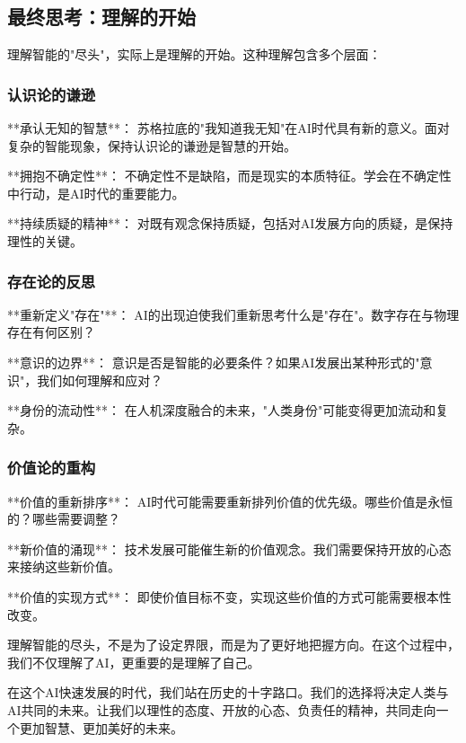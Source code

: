 \subsection{最终思考：理解的开始} %

理解智能的"尽头"，实际上是理解的开始。这种理解包含多个层面：

\subsubsection{认识论的谦逊}

**承认无知的智慧**：
苏格拉底的"我知道我无知"在AI时代具有新的意义。面对复杂的智能现象，保持认识论的谦逊是智慧的开始。

**拥抱不确定性**：
不确定性不是缺陷，而是现实的本质特征。学会在不确定性中行动，是AI时代的重要能力。

**持续质疑的精神**：
对既有观念保持质疑，包括对AI发展方向的质疑，是保持理性的关键。

\subsubsection{存在论的反思}

**重新定义"存在"**：
AI的出现迫使我们重新思考什么是"存在"。数字存在与物理存在有何区别？

**意识的边界**：
意识是否是智能的必要条件？如果AI发展出某种形式的"意识"，我们如何理解和应对？

**身份的流动性**：
在人机深度融合的未来，"人类身份"可能变得更加流动和复杂。

\subsubsection{价值论的重构}

**价值的重新排序**：
AI时代可能需要重新排列价值的优先级。哪些价值是永恒的？哪些需要调整？

**新价值的涌现**：
技术发展可能催生新的价值观念。我们需要保持开放的心态来接纳这些新价值。

**价值的实现方式**：
即使价值目标不变，实现这些价值的方式可能需要根本性改变。

\begin{center}
理解智能的尽头，不是为了设定界限，而是为了更好地把握方向。在这个过程中，我们不仅理解了AI，更重要的是理解了自己。
\end{center}

在这个AI快速发展的时代，我们站在历史的十字路口。我们的选择将决定人类与AI共同的未来。让我们以理性的态度、开放的心态、负责任的精神，共同走向一个更加智慧、更加美好的未来。

